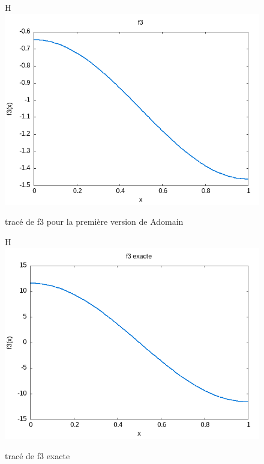 \documentclass{article}
\begin{document}
\begin{figure}{H}
    \centering
    \includegraphics[scale=0.8]{newImages/f3_adov1.png}
    \caption{tracé de f3 pour la première version de Adomain}
    \label{fig:enter-label}
\end{figure}

\begin{figure}{H}
    \centering
    \includegraphics[scale=0.8]{newImages/f3_ex.png}
    \caption{tracé de f3 exacte}
    \label{fig:enter-label}
\end{figure}
\end{document}
